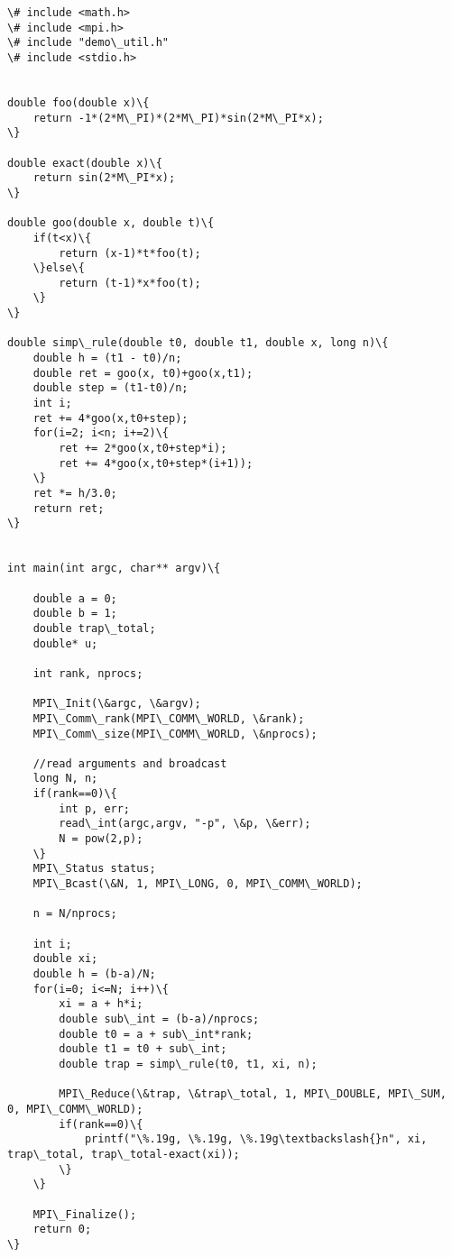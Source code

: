 \documentclass[11pt]{article}
\begin{document}
    \begin{Verbatim}[commandchars=\\\{\}]
\# include <math.h>
\# include <mpi.h>
\# include "demo\_util.h"
\# include <stdio.h>


double foo(double x)\{
    return -1*(2*M\_PI)*(2*M\_PI)*sin(2*M\_PI*x);
\}

double exact(double x)\{
    return sin(2*M\_PI*x);
\}

double goo(double x, double t)\{
    if(t<x)\{
        return (x-1)*t*foo(t);
    \}else\{
        return (t-1)*x*foo(t);
    \}
\}

double simp\_rule(double t0, double t1, double x, long n)\{
    double h = (t1 - t0)/n;
    double ret = goo(x, t0)+goo(x,t1);
    double step = (t1-t0)/n;
    int i;
    ret += 4*goo(x,t0+step);
    for(i=2; i<n; i+=2)\{
        ret += 2*goo(x,t0+step*i);
        ret += 4*goo(x,t0+step*(i+1));
    \}
    ret *= h/3.0;
    return ret;
\}


int main(int argc, char** argv)\{

    double a = 0;
    double b = 1;
    double trap\_total;
    double* u;    

    int rank, nprocs;

    MPI\_Init(\&argc, \&argv);
    MPI\_Comm\_rank(MPI\_COMM\_WORLD, \&rank);
    MPI\_Comm\_size(MPI\_COMM\_WORLD, \&nprocs);

    //read arguments and broadcast
    long N, n;
    if(rank==0)\{
        int p, err;
        read\_int(argc,argv, "-p", \&p, \&err);
        N = pow(2,p);
    \}
    MPI\_Status status;
    MPI\_Bcast(\&N, 1, MPI\_LONG, 0, MPI\_COMM\_WORLD);

    n = N/nprocs;

    int i;
    double xi;
    double h = (b-a)/N;
    for(i=0; i<=N; i++)\{
        xi = a + h*i;
        double sub\_int = (b-a)/nprocs;
        double t0 = a + sub\_int*rank;
        double t1 = t0 + sub\_int;
        double trap = simp\_rule(t0, t1, xi, n);

        MPI\_Reduce(\&trap, \&trap\_total, 1, MPI\_DOUBLE, MPI\_SUM, 0, MPI\_COMM\_WORLD);
        if(rank==0)\{
            printf("\%.19g, \%.19g, \%.19g\textbackslash{}n", xi, trap\_total, trap\_total-exact(xi));
        \}
    \}
    
    MPI\_Finalize();
    return 0;
\}

    \end{Verbatim}


    
    
    
    
\end{document}
